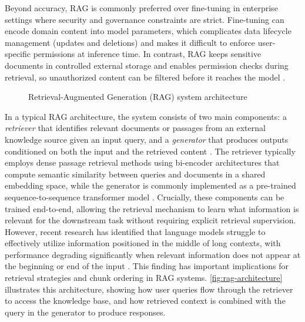 Beyond accuracy, RAG is commonly preferred over fine-tuning in enterprise settings where security and governance constraints are strict. Fine-tuning can encode domain content into model parameters, which complicates data lifecycle management (updates and deletions) and makes it difficult to enforce user-specific permissions at inference time. In contrast, RAG keeps sensitive documents in controlled external storage and enables permission checks during retrieval, so unauthorized content can be filtered before it reaches the model \parencite{jeongPermissionAwareRAGIdentity2025, zhongHoneyBeeEfficientRolebased2025}.

\begin{figure}[htbp]
    \centering
    \small{\resizebox{\textwidth}{!}{}}
    \caption{Retrieval-Augmented Generation (RAG) system architecture}
    \label{fig:rag-architecture}
\end{figure}

In a typical RAG architecture, the system consists of two main components: a \emph{retriever} that identifies relevant documents or passages from an external knowledge source given an input query, and a \emph{generator} that produces outputs conditioned on both the input and the retrieved content \parencite{NEURIPS2020_6b493230}. The retriever typically employs dense passage retrieval methods using bi-encoder architectures that compute semantic similarity between queries and documents in a shared embedding space, while the generator is commonly implemented as a pre-trained sequence-to-sequence transformer model \parencite{VaswaniAshish2017Aiay}. Crucially, these components can be trained end-to-end, allowing the retrieval mechanism to learn what information is relevant for the downstream task without requiring explicit retrieval supervision. However, recent research has identified that language models struggle to effectively utilize information positioned in the middle of long contexts, with performance degrading significantly when relevant information does not appear at the beginning or end of the input \parencite{liuLostMiddleHow2024}. This finding has important implications for retrieval strategies and chunk ordering in RAG systems. \autoref{fig:rag-architecture} illustrates this architecture, showing how user queries flow through the retriever to access the knowledge base, and how retrieved context is combined with the query in the generator to produce responses.

